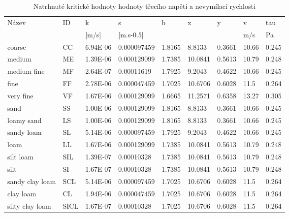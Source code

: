 \begin{sidewaystable}
% 
\centering
\caption{Natrhnuté kritické hodnoty hodnoty třecího napětí a nevymílací rychlosti }
\label{tab:kriticke}
{\small 
\begin{tabular}{lllllllll}
\hline
Název           & ID       & k         & s             & b      & x       & y      & v     & tau   \\
                &          & {[}m/s{]} & {[}m.s-0.5{]} &        &         &        & m/s   & Pa    \\
\hline \hline
coarse          & CC       & 6.94E-06  & 0.000097459   & 1.8165 & 8.8133  & 0.3661 & 10.66 & 0.245 \\
medium          & ME       & 1.39E-06  & 0.000129099   & 1.7385 & 10.0841 & 0.5613 & 10.79 & 0.248 \\
medium fine     & MF       & 2.64E-07  & 0.00011619    & 1.7925 & 9.2043  & 0.4622 & 10.66 & 0.245 \\
fine            & FF       & 2.78E-06  & 0.000047459   & 1.7025 & 10.6706 & 0.6028 & 11.5  & 0.264 \\
very fine       & VF       & 1.67E-06  & 0.000129099   & 1.6665 & 11.2571 & 0.6358 & 13.27 & 0.305 \\
sand            & SS       & 1.00E-06  & 0.000129099   & 1.8165 & 8.8133  & 0.3661 & 10.66 & 0.245 \\
loamy sand      & LS       & 1.00E-06  & 0.000129099   & 1.8165 & 8.8133  & 0.3661 & 10.66 & 0.245 \\
sandy loam      & SL       & 5.14E-06  & 0.000097459   & 1.7925 & 9.2043  & 0.4622 & 10.66 & 0.245 \\
loam            & LL       & 1.67E-06  & 0.000129099   & 1.7385 & 10.0841 & 0.5613 & 10.79 & 0.248 \\
silt loam       & SIL      & 1.39E-07  & 0.00010328    & 1.7385 & 10.0841 & 0.5613 & 10.79 & 0.248 \\
silt            & SI       & 1.67E-07  & 0.00010328    & 1.7385 & 10.0841 & 0.5613 & 10.79 & 0.248 \\
sandy clay loam & SCL      & 5.14E-06  & 0.000097459   & 1.7025 & 10.6706 & 0.6028 & 11.5  & 0.264 \\
clay loam       & CL       & 1.94E-06  & 0.000047459   & 1.7025 & 10.6706 & 0.6028 & 11.5  & 0.264 \\
silty clay loam & SICL     & 1.67E-07  & 0.00010328    & 1.7025 & 10.6706 & 0.6028 & 11.5  & 0.264 \\

\end{tabular}}
\end{sidewaystable}

